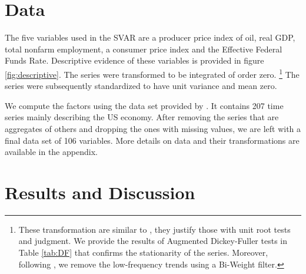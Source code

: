 \documentclass[11pt,a4paper]{article}
\begin{document}
\section{Data}
\label{sec:data}

The five variables used in the SVAR are a producer price index of oil,  real GDP, total nonfarm employment, a consumer price index and the Effective Federal Funds Rate. Descriptive evidence of these variables is provided in figure \ref{fig:descriptive}. 
The series were transformed to be  integrated of order zero. \footnote{These transformation are similar to \cite{stock2015factor}, they justify those with unit root tests and judgment.  We provide the results of Augmented Dickey-Fuller tests  in Table \ref{tab:DF} that confirms the stationarity of the series.  Moreover, following \cite{stock2015factor}, we remove the low-frequency trends using a Bi-Weight filter.   }
The series were subsequently standardized to have unit variance and mean zero.

We compute the factors using the data set provided by \cite{stock2015factor}. It contains 207 time series  mainly describing the US economy.
After removing the series that are aggregates of others and dropping the ones with missing values, we are left with a final data set of 106 variables. More details on data and their transformations are available in the appendix.

\section{Results and Discussion}
\label{sec:results}
\end{document}
